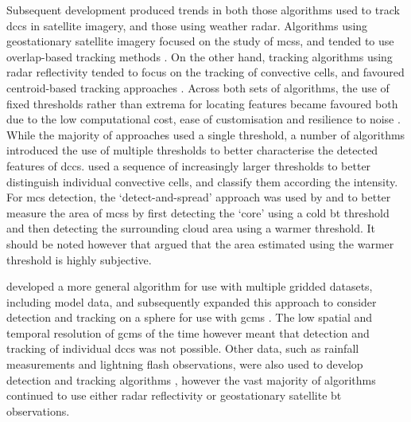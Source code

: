 Subsequent development produced trends in both those algorithms used to track \acrshort{dcc}s in satellite imagery, and those using weather radar.
Algorithms using geostationary satellite imagery focused on the study of \acrshort{mcs}s, and tended to use overlap-based tracking methods \citep{arnaud_automatic_1992, evans_procedure_1996, carvalho_satellite_2001, morel_climatology_2002}.
On the other hand, tracking algorithms using radar reflectivity tended to focus on the tracking of convective cells, and favoured centroid-based tracking approaches \citep{dixon_titan_1993, johnson_storm_1998, handwerker_cell_2002}.
Across both sets of algorithms, the use of fixed thresholds rather than extrema for locating features became favoured both due to the low computational cost, ease of customisation and resilience to noise \citep{augustine_mesoscale_1988}.
While the majority of approaches used a single threshold, a number of algorithms introduced the use of multiple thresholds to better characterise the detected features of \acrshort{dcc}s.
\citet{johnson_storm_1998} used a sequence of increasingly larger thresholds to better distinguish individual convective cells, and classify them according the intensity.
For \acrshort{mcs} detection, the `detect-and-spread' approach was used by \citet{evans_procedure_1996} and \citet{boer_lagrangian_1997} to better measure the area of \acrshort{mcs}s by first detecting the `core' using a cold \acrshort{bt} threshold and then detecting the surrounding cloud area using a warmer threshold.
It should be noted however that \citet{augustine_mesoscale_1988} argued that the area estimated using the warmer threshold is highly subjective.

\citet{hodges_general_1994} developed a more general algorithm for use with multiple gridded datasets, including model data, and subsequently expanded this approach to consider detection and tracking on a sphere for use with \acrshort{gcm}s \citep{hodges_feature_1995}.
The low spatial and temporal resolution of \acrshort{gcm}s of the time however meant that detection and tracking of individual \acrshort{dcc}s was not possible.
Other data, such as rainfall measurements and lightning flash observations, were also used to develop detection and tracking algorithms \citep{steinacker_automatic_2000}, however the vast majority of algorithms continued to use either radar reflectivity or geostationary satellite \acrshort{bt} observations.

